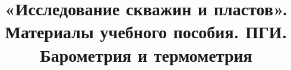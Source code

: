 \documentclass{article}
\begin{document}
\title{«Исследование скважин и пластов». Материалы учебного пособия. ПГИ. Барометрия и термометрия}

\maketitle


\tableofcontents{}





\printbibliography
\end{document}

